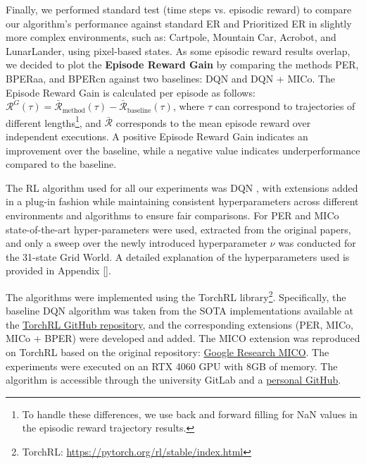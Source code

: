 Finally, we performed standard test (time steps vs. episodic reward) to compare our algorithm's performance against standard ER and Prioritized ER in slightly more complex environments, such as: Cartpole, Mountain Car, Acrobot, and LunarLander, using pixel-based states. As some episodic reward results overlap, we decided to plot the \textbf{Episode Reward Gain} by comparing the methods PER, BPERaa, and BPERcn against two baselines: DQN and DQN + MICo. The Episode Reward Gain is calculated per episode as follows: \(\mathcal{R}^G(\tau) = \bar{\mathcal{R}}_{\text{method}}(\tau) - \bar{\mathcal{R}}_{\text{baseline}}(\tau)\), where \(\tau\) can correspond to trajectories of different lengths\footnote{To handle these differences, we use back and forward filling for NaN values in the episodic reward trajectory results.}, and $\bar{\mathcal{R}}$ corresponds to the mean episode reward over independent executions. A positive Episode Reward Gain indicates an improvement over the baseline, while a negative value indicates underperformance compared to the baseline.

The RL algorithm used for all our experiments was DQN \cite{mnih2013playing}, with extensions added in a plug-in fashion while maintaining consistent hyperparameters across different environments and algorithms to ensure fair comparisons. For PER and MICo state-of-the-art hyper-parameters were used, extracted from the original papers, and only a sweep over the newly introduced hyperparameter \(\nu\) was conducted for the 31-state Grid World. A detailed explanation of the hyperparameters used is provided in Appendix \ref{}.

The algorithms were implemented using the TorchRL library\footnote{TorchRL: \href{https://pytorch.org/rl/stable/index.html}{https://pytorch.org/rl/stable/index.html}}. Specifically, the baseline DQN algorithm was taken from the SOTA implementations available at the \href{https://github.com/pytorch/rl/tree/main/sota-implementations/dqn}{TorchRL GitHub repository}, and the corresponding extensions (PER, MICo, MICo + BPER) were developed and added. The MICO extension was reproduced on TorchRL based on the original repository: \href{https://github.com/google-research/google-research/tree/master/mico}{Google Research MICO}. The experiments were executed on an RTX 4060 GPU with 8GB of memory. The algorithm is accessible through the university GitLab and a \href{https://github.com/ZosoV/final_project}{personal GitHub}.



